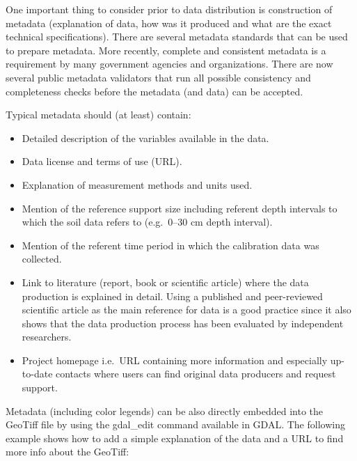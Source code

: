 \documentclass[10pt,b5paper,]{book}
\providecommand{\tightlist}{%
  \setlength{\itemsep}{0pt}\setlength{\parskip}{0pt}}
\theoremstyle{definition}
\theoremstyle{definition}
\theoremstyle{definition}
\theoremstyle{remark}
\begin{document}
One important thing to consider prior to data distribution is
construction of metadata (explanation of data, how was it produced and
what are the exact technical specifications). There are several metadata
standards that can be used to prepare metadata. More recently, complete
and consistent metadata is a requirement by many government agencies and
organizations. There are now several public metadata validators that run
all possible consistency and completeness checks before the metadata
(and data) can be accepted.

Typical metadata should (at least) contain:

\begin{itemize}
\tightlist
\item
  Detailed description of the variables available in the data.
\item
  Data license and terms of use (URL).
\item
  Explanation of measurement methods and units used.
\item
  Mention of the reference support size including referent depth
  intervals to which the soil data refers to (e.g.~0--30 cm depth
  interval).
\item
  Mention of the referent time period in which the calibration data was
  collected.
\item
  Link to literature (report, book or scientific article) where the data
  production is explained in detail. Using a published and peer-reviewed
  scientific article as the main reference for data is a good practice
  since it also shows that the data production process has been
  evaluated by independent researchers.
\item
  Project homepage i.e.~URL containing more information and especially
  up-to-date contacts where users can find original data producers and
  request support.
\end{itemize}

Metadata (including color legends) can be also directly embedded into
the GeoTiff file by using the gdal\_edit command available in GDAL. The
following example shows how to add a simple explanation of the data and
a URL to find more info about the GeoTiff:
\end{document}
